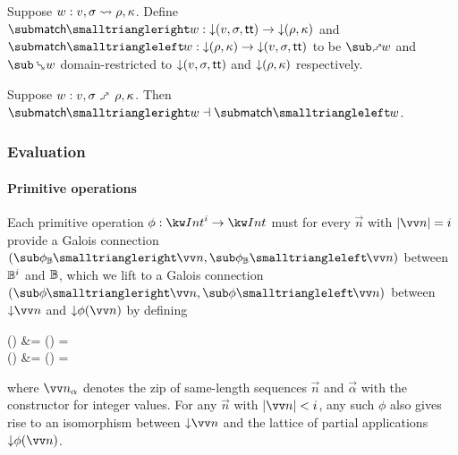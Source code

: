\begin{definition}
   Suppose $w: v, \sigma \rightsquigarrow \rho, \kappa$. Define $\matchFwdF{w}: \Below{(v,\sigma,\TT)} \to \Below{(\rho,\kappa)}$ and $\matchBwdF{w}: \Below{(\rho,\kappa)} \to \Below{(v,\sigma,\TT)}$ to be $\matchFwdR{w}$ and $\matchBwdR{w}$ domain-restricted to ${\downarrow}{(v,\sigma,\mathsf{tt})}$ and ${\downarrow}{(\rho,\kappa)}$ respectively.
\end{definition}

\begin{theorem}
\label{thm:core-language:match:gc}
   Suppose $w: v, \sigma \matchFwdS \rho, \kappa$.  Then $\matchFwdF{w} \adjoint \matchBwdF{w}$.
\end{theorem}

\subsubsection{Evaluation}

\paragraph{Primitive operations}

Each primitive operation $\phi: \tyInt^{i} \to \tyInt$ must for every $\vec{n}$ with $\length{\vec{n}} = i$ provide a Galois connection $(\primFwdBool{\phi}{\vec{n}}, \primBwdBool{\phi}{\vec{n}})$ between $\mathbb{B}^i$ and $\mathbb{B}$, which we lift to a Galois connection $(\primFwd{\phi}{\vec{n}}, \primBwd{\phi}{\vec{n}})$ between $\Below{\vec{n}}$ and $\Below{\phi(\vec{n})}$ by defining
\begin{definition}
\label{def:core-language:primop-gc}
\begin{salign}
   () &= 
   (\vec{\alpha}) = \beta
   \\
   () &= 
   (\beta) = \vec{\alpha}
\end{salign}
\end{definition}

\noindent where $\vec{\annInt{n}{\alpha}}$ denotes the zip of same-length sequences $\vec{n}$ and $\vec{\alpha}$ with the constructor for integer values. For any $\vec{n}$ with $\length{\vec{n}} \numlt i$, any such $\phi$ also gives rise to an isomorphism between $\Below{\vec{n}}$ and the lattice of partial applications $\Below{\exPrimOp{\phi}{\vec{n}}}$.

